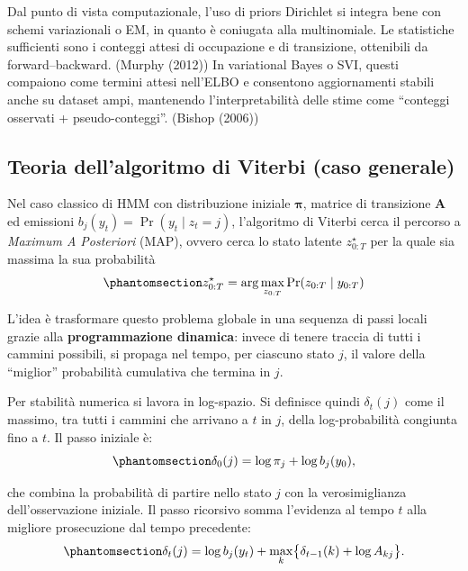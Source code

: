 \documentclass[
  italian,
  a4paper,
  a4paper,
  twoside,
  open=right,
  12pt]{scrbook}
\theoremstyle{definition}
\theoremstyle{remark}
\begin{document}
Dal punto di vista computazionale, l'uso di priors Dirichlet si integra
bene con schemi variazionali o EM, in quanto è coniugata alla
multinomiale. Le statistiche sufficienti sono i conteggi attesi di
occupazione e di transizione, ottenibili da forward--backward. (Murphy
(2012)) In variational Bayes o SVI, questi compaiono come termini attesi
nell'ELBO e consentono aggiornamenti stabili anche su dataset ampi,
mantenendo l'interpretabilità delle stime come ``conteggi osservati +
pseudo-conteggi''. (Bishop (2006))

\subsection{Teoria dell'algoritmo di Viterbi (caso
generale)}\label{sec-teoria_viterbi}

Nel caso classico di HMM con distribuzione iniziale
\(\boldsymbol{\pi}\), matrice di transizione \(\mathbf{A}\) ed emissioni
\(b_j(y_t)=\Pr(y_t\mid z_t{=}j)\), l'algoritmo di Viterbi cerca il
percorso a \emph{Maximum A Posteriori} (MAP), ovvero cerca lo stato
latente \(z_{0:T}^\star\) per la quale sia massima la sua probabilità
\begin{equation}\phantomsection\label{eq-MAP_z}{
z_{0:T}^\star=\arg\max_{z_{0:T}}\Pr(z_{0:T}\mid y_{0:T})
}\end{equation}

L'idea è trasformare questo problema globale in una sequenza di passi
locali grazie alla \textbf{programmazione dinamica}: invece di tenere
traccia di tutti i cammini possibili, si propaga nel tempo, per ciascuno
stato \(j\), il valore della ``miglior'' probabilità cumulativa che
termina in \(j\).

Per stabilità numerica si lavora in log-spazio. Si definisce quindi
\(\delta_t(j)\) come il massimo, tra tutti i cammini che arrivano a
\(t\) in \(j\), della log-probabilità congiunta fino a \(t\). Il passo
iniziale è: \begin{equation}\phantomsection\label{eq-viterbi_0}{
\delta_0(j)=\log \pi_j+\log b_j(y_0),
}\end{equation}

che combina la probabilità di partire nello stato \(j\) con la
verosimiglianza dell'osservazione iniziale. Il passo ricorsivo somma
l'evidenza al tempo \(t\) alla migliore prosecuzione dal tempo
precedente: \begin{equation}\phantomsection\label{eq-viterbi_t}{
\delta_t(j)=\log b_j(y_t)+\max_k\bigl\{\delta_{t-1}(k)+\log A_{k j}\bigr\}.
}\end{equation}
\end{document}

